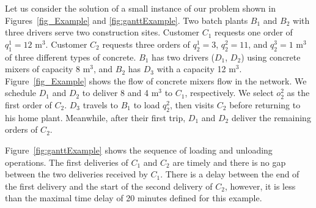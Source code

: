 \documentclass{article}
\begin{document}
Let us consider the solution of a small instance of our problem shown in Figures~\ref{fig_Example} and \ref{fig:ganttExample}. Two batch plants $B_1$ and $B_2$ with three drivers serve two construction sites. Customer $C_1$ requests one order of $q^1_1=12$ m$^3$. Customer $C_2$ requests three orders of $q^1_2=3$, $q^2_2=11$, and $q^3_2=1$ m$^3$ of three different types of concrete. $B_1$ has two drivers ($D_1$, $D_2$) using concrete mixers of capacity 8 m$^3$, and $B_2$ has $D_3$ with a capacity 12 m$^3$. Figure~\ref{fig_Example} shows the flow of concrete mixers flow in the network. We schedule $D_1$ and $D_2$ to deliver 8 and 4 m$^3$ to $C_1$, respectively. We select $o^2_2$ as the first order of $C_2$. $D_3$ travels to $B_1$ to load $q^2_2$, then visits $C_2$ before returning to his home plant. Meanwhile, after their first trip,  $D_1$ and $D_2$ deliver the remaining orders of $C_2$.

Figure~\ref{fig:ganttExample} shows the sequence of loading and unloading operations. The first deliveries of $C_1$ and $C_2$ are timely and there is no gap between the two deliveries received by $C_1$. There is a delay between the end of the first delivery and the start of the second delivery of $C_2$, however, it is less than the maximal time delay of 20 minutes defined for this example.
\end{document}
